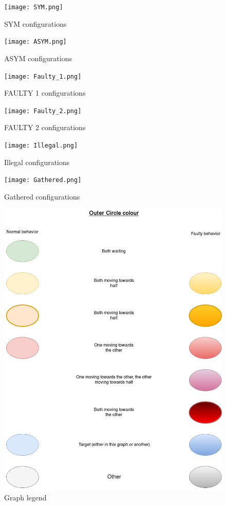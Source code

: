 \documentclass[11pt]{article}
\begin{document}
\pagebreak
\begin{figure}[htb]
	\centering
	\texttt{[image: SYM.png]}
	\caption{SYM configurations}
\end{figure}
\pagebreak

\begin{figure}[htb]
	\centering
	\texttt{[image: ASYM.png]}
	\caption{ASYM configurations}
\end{figure}
\pagebreak

\begin{figure}[htb]
	\centering
	\texttt{[image: Faulty\_1.png]}
	\caption{FAULTY 1 configurations}
\end{figure}
\pagebreak

\begin{figure}[htb]
	\centering
	\texttt{[image: Faulty\_2.png]}
	\caption{FAULTY 2 configurations}
\end{figure}
\pagebreak

\begin{figure}[htb]
	\centering
	\texttt{[image: Illegal.png]}
	\caption{Illegal configurations}
\end{figure}
\pagebreak

\begin{figure}[htb]
	\centering
	\texttt{[image: Gathered.png]}
	\caption{Gathered configurations}
\end{figure}
\pagebreak

\begin{figure}[htb]
	\centering
	\includegraphics[scale=0.7]{Legend.png}
	\caption{Graph legend}
\end{figure}
\pagebreak
\end{document}
